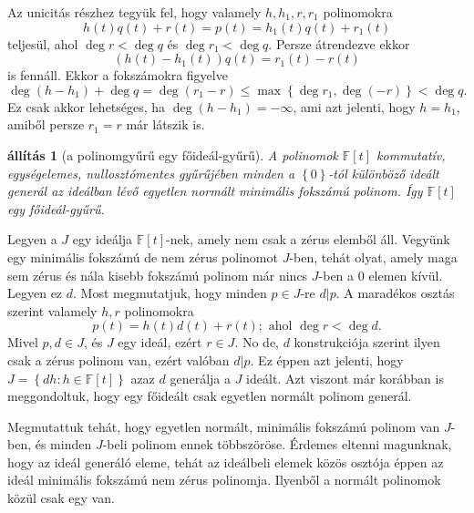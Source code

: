 \documentclass[9pt, a4paper, showtrims]{memoir}
\makeatletter
\renewenvironment{proof}[1][\proofname]
    {\par\pushQED{\qed}%
    \normalfont \topsep6\p@\@plus6\p@\relax
    \trivlist
    \item[\hskip\labelsep
        \itshape
    #1\@addpunct{:}]\ignorespaces}
    {\popQED\endtrivlist\@endpefalse}
\theoremstyle{plain}
\newtheorem{proposition}{állítás}[chapter]
\theoremstyle{remark}
\theoremstyle{definition}
\makeatother
\begin{document}
\begin{proof}
	Az unicitás részhez tegyük fel, hogy valamely $h,h_1,r,r_1$ polinomokra
	\[
		h\left( t \right)q\left( t \right)+r\left( t \right)
		=
		p\left( t \right)
		=
		h_1\left( t \right)q\left( t \right)+r_1\left( t \right)
	\]
	teljesül, ahol $\deg r<\deg q$ és $\deg r_1<\deg q$.
	Persze átrendezve ekkor
	\[
		\left( h\left( t \right)-h_1\left( t \right) \right)q\left( t \right)
		=
		r_1\left( t \right)-r\left( t \right)
	\]
	is fennáll.
	Ekkor a fokszámokra figyelve
	\[
		\deg\left( h-h_1 \right)+\deg q
		=
		\deg\left( r_1-r \right)
		\leq
		\max\left\{ \deg r_1,\deg (-r) \right\}
		<
		\deg q.
	\]
	Ez csak akkor lehetséges, ha $\deg\left( h-h_1 \right)=-\infty$,
	ami azt jelenti, hogy $h=h_1$,
	amiből persze $r_1=r$ már látszik is.
\end{proof}
\begin{proposition}[a polinomgyűrű egy főideál-gyűrű]\label{pr:pgyurufoidealgyuru}
	A polinomok $\mathbb{F}\left[ t \right]$ kommutatív, egységelemes, nullosztómentes gyűrűjében
	minden a $\left\{ 0 \right\}$-tól különböző ideált generál az ideálban lévő egyetlen normált minimális fokszámú polinom.
	Így $\mathbb{F}\left[ t \right]$ egy főideál-gyűrű.
\end{proposition}
\begin{proof}
	Legyen a $J$ egy ideálja $\mathbb{F}\left[ t \right]$-nek,
	amely nem csak a zérus elemből áll.
	Vegyünk egy minimális fokszámú de nem zérus polinomot $J$-ben,
	tehát olyat,
	amely maga sem zérus és nála kisebb fokszámú polinom már nincs $J$-ben a $0$ elemen kívül.
	Legyen ez $d$.
	Most megmutatjuk, hogy minden $p\in J$-re $d|p$.
	A maradékos osztás szerint
	valamely $h,r$ polinomokra
	\[
		p\left( t \right)=
		h\left( t \right)d\left( t \right)+r\left( t \right);
		\text{ ahol }
		\deg r<\deg d.
	\]
	Mivel $p,d\in J$, és $J$ egy ideál, ezért $r\in J$.
	No de, $d$ konstrukciója szerint ilyen csak a zérus polinom van,
	ezért valóban $d|p$.
	Ez éppen azt jelenti, hogy
	\(
	J=\left\{ dh:h\in\mathbb{F}\left[ t \right] \right\}
	\)
	azaz $d$ generálja a $J$ ideált.
	Azt viszont már korábban is meggondoltuk,
	hogy egy főideált csak egyetlen normált polinom generál.

	Megmutattuk tehát,
	hogy egyetlen normált, minimális fokszámú polinom van $J$-ben,
	és minden $J$-beli polinom ennek többszöröse.
\end{proof}
Érdemes eltenni magunknak, hogy az ideál generáló eleme, tehát az ideálbeli elemek közös osztója
éppen az ideál minimális fokszámú nem zérus polinomja.
Ilyenből a normált polinomok közül csak egy van.
\end{document}
